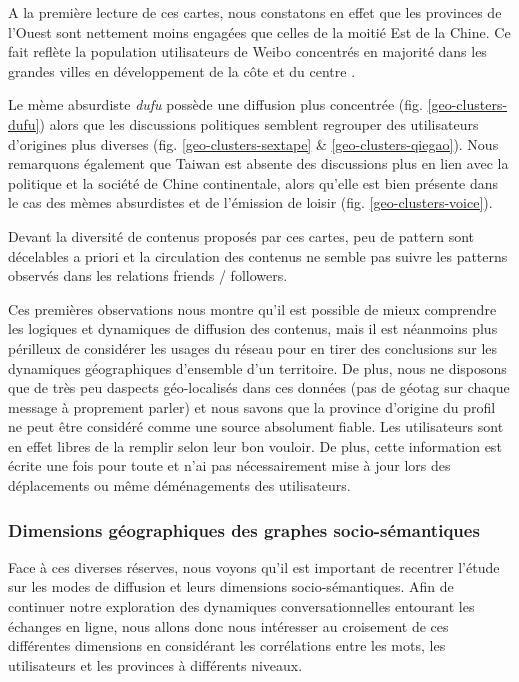 A la premi\`ere lecture de ces cartes, nous constatons en effet que les
provinces de l{\textquoteright}Ouest sont nettement moins engag\'ees
que celles de la moiti\'e Est de la Chine. Ce fait refl\`ete la
population utilisateurs de Weibo concentr\'es en majorit\'e dans les
grandes villes en d\'eveloppement de la c\^ote et du centre \cite{Fu2013}. 

Le m\`eme absurdiste \textit{dufu} poss\`ede une diffusion plus
concentr\'ee (fig. \ref{geo-clusters-dufu}) alors que les discussions politiques semblent regrouper
des utilisateurs d{\textquoteright}origines plus diverses (fig. \ref{geo-clusters-sextape} \& \ref{geo-clusters-qiegao}). Nous
remarquons \'egalement que Taiwan est absente des discussions plus en
lien avec la politique et la soci\'et\'e de Chine continentale, alors
qu{\textquoteright}elle est bien pr\'esente dans le cas des m\`emes
absurdistes et de l{\textquoteright}\'emission de loisir (fig. \ref{geo-clusters-voice}). 

Devant la diversit\'e de contenus propos\'es par ces cartes, peu de
pattern sont d\'ecelables a priori et la circulation des contenus ne
semble pas suivre les patterns observ\'es dans les relations friends /
followers.


Ces premi\`eres observations nous montre qu{\textquoteright}il est
possible de mieux comprendre les logiques et dynamiques de diffusion
des contenus, mais il est n\'eanmoins plus p\'erilleux de consid\'erer
les usages du r\'eseau pour en tirer des conclusions sur les dynamiques
g\'eographiques d{\textquoteright}ensemble d{\textquoteright}un
territoire. De plus, nous ne disposons que de tr\`es peu
d{\textquotesingle}aspects
{\textquotedbl}g\'eo-localis\'es{\textquotedbl} dans ces donn\'ees (pas
de g\'eotag sur chaque message \`a proprement parler) et nous savons
que la province d{\textquoteright}origine du profil ne peut \^etre
consid\'er\'e comme une source absolument fiable. Les utilisateurs sont
en effet libres de la remplir selon leur bon vouloir. De plus, cette
information est \'ecrite une fois pour toute et n{\textquoteright}ai
pas n\'ecessairement mise \`a jour lors des d\'eplacements ou m\^eme
d\'em\'enagements des utilisateurs.


\subsubsection{Dimensions g\'eographiques des graphes socio-s\'emantiques}
Face \`a ces diverses r\'eserves, nous voyons qu{\textquoteright}il est
important de recentrer l{\textquoteright}\'etude sur les modes de
diffusion et leurs dimensions socio-s\'emantiques. Afin de continuer
notre exploration des dynamiques conversationnelles entourant les
\'echanges en ligne, nous allons donc nous int\'eresser au croisement
de ces diff\'erentes dimensions en consid\'erant les corr\'elations
entre les mots, les utilisateurs et les provinces \`a diff\'erents
niveaux.


